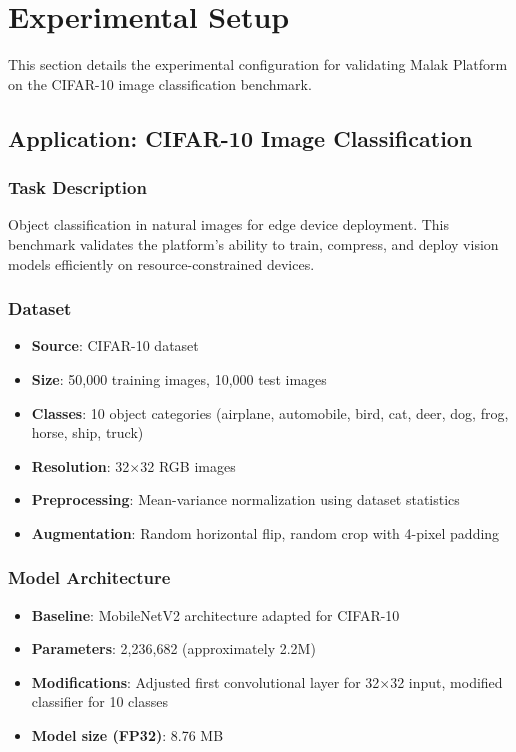 \section{Experimental Setup}

This section details the experimental configuration for validating Malak Platform on the CIFAR-10 image classification benchmark.

\subsection{Application: CIFAR-10 Image Classification}

\subsubsection{Task Description}
Object classification in natural images for edge device deployment. This benchmark validates the platform's ability to train, compress, and deploy vision models efficiently on resource-constrained devices.

\subsubsection{Dataset}
\begin{itemize}
\item \textbf{Source}: CIFAR-10 dataset \cite{cifar10}
\item \textbf{Size}: 50,000 training images, 10,000 test images
\item \textbf{Classes}: 10 object categories (airplane, automobile, bird, cat, deer, dog, frog, horse, ship, truck)
\item \textbf{Resolution}: 32$\times$32 RGB images
\item \textbf{Preprocessing}: Mean-variance normalization using dataset statistics
\item \textbf{Augmentation}: Random horizontal flip, random crop with 4-pixel padding
\end{itemize}

\subsubsection{Model Architecture}
\begin{itemize}
\item \textbf{Baseline}: MobileNetV2 architecture adapted for CIFAR-10
\item \textbf{Parameters}: 2,236,682 (approximately 2.2M)
\item \textbf{Modifications}: Adjusted first convolutional layer for 32$\times$32 input, modified classifier for 10 classes
\item \textbf{Model size (FP32)}: 8.76 MB
\end{itemize}

